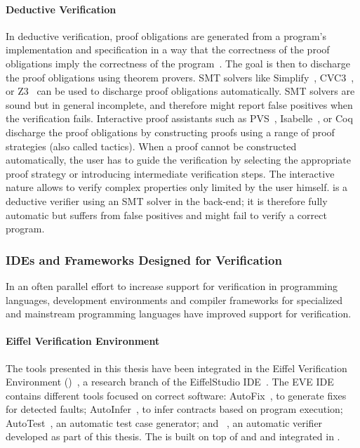 \paragraph{Deductive Verification}

In deductive verification, proof obligations are generated from a program's implementation and specification in a way that the correctness of the proof obligations imply the correctness of the program~\cite{HOARE69}.
The goal is then to discharge the proof obligations using theorem provers.
SMT solvers like Simplify~\cite{DETLEFS05}, CVC3~\cite{BARRETT07}, or Z3~\cite{MOURA08} can be used to discharge proof obligations automatically.
SMT solvers are sound but in general incomplete, and therefore might report false positives when the verification fails.
Interactive proof assistants such as PVS~\cite{OWRE92}, Isabelle~\cite{NIPKOW02}, or Coq~\cite{COQ} discharge the proof obligations by constructing proofs using a range of proof strategies (also called tactics).
When a proof cannot be constructed automatically, the user has to guide the verification by selecting the appropriate proof strategy or introducing intermediate verification steps.
The interactive nature allows to verify complex properties only limited by the user himself.
\AutoProof is a deductive verifier using an SMT solver in the back-end; it is therefore fully automatic but suffers from false positives and might fail to verify a correct program.


\subsubsection{IDEs and Frameworks Designed for Verification}

In an often parallel effort to increase support for verification in programming languages, development environments and compiler frameworks for specialized and mainstream programming languages have improved support for verification.

\paragraph{Eiffel Verification Environment}

The tools presented in this thesis have been integrated in the Eiffel Verification Environment (\EVE)~\cite{EVE}, a research branch of the EiffelStudio IDE~\cite{EIFFELSTUDIO}.
The EVE IDE contains different tools focused on correct software:
AutoFix~\cite{PEI15}, to generate fixes for detected faults;
AutoInfer~\cite{WEI11}, to infer contracts based on program execution;
AutoTest~\cite{MEYER09}, an automatic test case generator;
and \AutoProof~\cite{TSCHANNEN15}, an automatic verifier developed as part of this thesis.
The \VAssist is built on top of \AutoTest and \AutoProof and integrated in \EVE.

